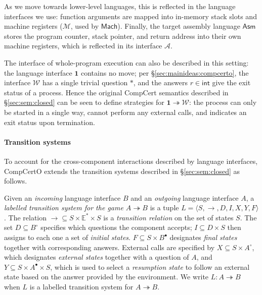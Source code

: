 \documentclass[sigplan,10pt,review]{acmart}
\newcommand{\kw}[1]{\ensuremath{ \mathsf{#1} }}
\newcommand{\que}{\circ}
\newcommand{\ans}{\bullet}
\begin{document}
As we move towards lower-level languages,
this is reflected in the language interfaces we use:
function arguments are mapped into
in-memory stack slots and machine registers
($\mathcal{M}$, used by \kw{Mach}).
Finally, the target assembly language \kw{Asm}
stores the program counter, stack pointer,
and return address into their own machine registers,
which is reflected in its interface $\mathcal{A}$.

The interface of whole-program execution
can also be described in this setting:
the language interface $\mathbf{1}$ contains no move;
per \S\ref{sec:mainideas:compcerto},
the interface $\mathcal{W}$ has a single trivial question $*$,
and the answers $r \in \kw{int}$
give the exit status of a process.
Hence the original CompCert semantics described in
\S\ref{sec:sem:closed}
can be seen to define strategies for
$\mathbf{1} \twoheadrightarrow \mathcal{W}$:
the process can only be started in a single way,
cannot perform any external calls,
and indicates an exit status upon termination.


\paragraph{Transition systems} %

To account for the cross-component interactions
described by language interfaces,
CompCertO extends
the transition systems described in \S\ref{sec:sem:closed}
as follows.

\begin{definition} \label{def:lts}
Given an \emph{incoming} language interface $B$
and an \emph{outgoing} language interface $A$,
a \emph{labelled transition system for the game $A \twoheadrightarrow B$}
is a tuple $L = \langle S, \rightarrow, D, I, X, Y, F \rangle$.
The relation
${\rightarrow} \subseteq S \times \mathbb{E}^* \times S$ is
a \emph{transition relation} on the set of states $S$.
The set $D \subseteq B^\que$ specifies which
questions the component accepts;
$I \subseteq D \times S$ then
assigns to each one a set of \emph{initial states}.
$F \subseteq S \times B^\ans$
designates \emph{final states} together with corresponding answers.
External calls are specified by
$X \subseteq S \times A^\que$,
which designates \emph{external states} together with
a question of $A$, and
$Y \subseteq S \times A^\ans \times S$,
which is used to select a \emph{resumption state}
to follow an external state
based on the answer provided by the environment.
We write $L : A \twoheadrightarrow B$ when
$L$ is a labelled transition system for $A \twoheadrightarrow B$.
\end{definition}
\end{document}
